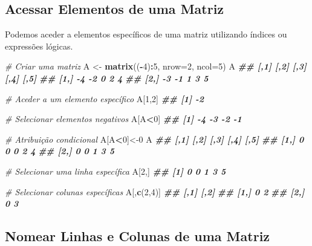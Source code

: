 \documentclass[
]{book}
\newenvironment{Shaded}{\begin{snugshade}}{\end{snugshade}}
\newcommand{\AttributeTok}[1]{\textcolor[rgb]{0.13,0.29,0.53}{#1}}
\newcommand{\CommentTok}[1]{\textcolor[rgb]{0.56,0.35,0.01}{\textit{#1}}}
\newcommand{\DecValTok}[1]{\textcolor[rgb]{0.00,0.00,0.81}{#1}}
\newcommand{\DocumentationTok}[1]{\textcolor[rgb]{0.56,0.35,0.01}{\textbf{\textit{#1}}}}
\newcommand{\FunctionTok}[1]{\textcolor[rgb]{0.13,0.29,0.53}{\textbf{#1}}}
\newcommand{\NormalTok}[1]{#1}
\newcommand{\OtherTok}[1]{\textcolor[rgb]{0.56,0.35,0.01}{#1}}
\newcommand{\SpecialCharTok}[1]{\textcolor[rgb]{0.81,0.36,0.00}{\textbf{#1}}}
\begin{document}
\subsection{Acessar Elementos de uma Matriz}\label{acessar-elementos-de-uma-matriz}

Podemos aceder a elementos específicos de uma matriz utilizando índices
ou expressões lógicas.

\begin{Shaded}
\begin{Highlighting}[]
\CommentTok{\# Criar uma matriz}
\NormalTok{A }\OtherTok{\textless{}{-}} \FunctionTok{matrix}\NormalTok{((}\SpecialCharTok{{-}}\DecValTok{4}\NormalTok{)}\SpecialCharTok{:}\DecValTok{5}\NormalTok{, }\AttributeTok{nrow=}\DecValTok{2}\NormalTok{, }\AttributeTok{ncol=}\DecValTok{5}\NormalTok{)}
\NormalTok{A}
\DocumentationTok{\#\#      [,1] [,2] [,3] [,4] [,5]}
\DocumentationTok{\#\# [1,]   {-}4   {-}2    0    2    4}
\DocumentationTok{\#\# [2,]   {-}3   {-}1    1    3    5}

\CommentTok{\# Aceder a um elemento específico}
\NormalTok{A[}\DecValTok{1}\NormalTok{,}\DecValTok{2}\NormalTok{]}
\DocumentationTok{\#\# [1] {-}2}

\CommentTok{\# Selecionar elementos negativos}
\NormalTok{A[A}\SpecialCharTok{\textless{}}\DecValTok{0}\NormalTok{]}
\DocumentationTok{\#\# [1] {-}4 {-}3 {-}2 {-}1}
 
\CommentTok{\# Atribuição condicional}
\NormalTok{A[A}\SpecialCharTok{\textless{}}\DecValTok{0}\NormalTok{]}\OtherTok{\textless{}{-}}\DecValTok{0}
\NormalTok{A}
\DocumentationTok{\#\#      [,1] [,2] [,3] [,4] [,5]}
\DocumentationTok{\#\# [1,]    0    0    0    2    4}
\DocumentationTok{\#\# [2,]    0    0    1    3    5}

\CommentTok{\# Selecionar uma linha específica}
\NormalTok{A[}\DecValTok{2}\NormalTok{,]}
\DocumentationTok{\#\# [1] 0 0 1 3 5}

\CommentTok{\# Selecionar colunas específicas}
\NormalTok{A[,}\FunctionTok{c}\NormalTok{(}\DecValTok{2}\NormalTok{,}\DecValTok{4}\NormalTok{)]}
\DocumentationTok{\#\#      [,1] [,2]}
\DocumentationTok{\#\# [1,]    0    2}
\DocumentationTok{\#\# [2,]    0    3}
\end{Highlighting}
\end{Shaded}

\subsection{Nomear Linhas e Colunas de uma Matriz}\label{nomear-linhas-e-colunas-de-uma-matriz}
\end{document}
